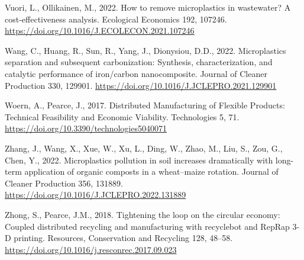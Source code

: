 \documentclass[]{elsarticle} %
\newlength{\cslhangindent}
\newlength{\cslentryspacingunit} %
\newenvironment{CSLReferences}[2] %
 {%
  \setlength{\parindent}{0pt}
  \ifodd #1
  \let\oldpar\par
  \def\par{\hangindent=\cslhangindent\oldpar}
  \fi
  \setlength{\parskip}{#2\cslentryspacingunit}
 }%
 {}
\begin{document}
\begin{CSLReferences}{1}{0}
\leavevmode{}%
Vuori, L., Ollikainen, M., 2022. How to remove microplastics in wastewater? {A} cost-effectiveness analysis. Ecological Economics 192, 107246. \url{https://doi.org/10.1016/J.ECOLECON.2021.107246}

\leavevmode{}%
Wang, C., Huang, R., Sun, R., Yang, J., Dionysiou, D.D., 2022. Microplastics separation and subsequent carbonization: {Synthesis}, characterization, and catalytic performance of iron/carbon nanocomposite. Journal of Cleaner Production 330, 129901. \url{https://doi.org/10.1016/J.JCLEPRO.2021.129901}

\leavevmode{}%
Woern, A., Pearce, J., 2017. Distributed {Manufacturing} of {Flexible Products}: {Technical Feasibility} and {Economic Viability}. Technologies 5, 71. \url{https://doi.org/10.3390/technologies5040071}

\leavevmode{}%
Zhang, J., Wang, X., Xue, W., Xu, L., Ding, W., Zhao, M., Liu, S., Zou, G., Chen, Y., 2022. Microplastics pollution in soil increases dramatically with long-term application of organic composts in a wheat--maize rotation. Journal of Cleaner Production 356, 131889. \url{https://doi.org/10.1016/J.JCLEPRO.2022.131889}

\leavevmode{}%
Zhong, S., Pearce, J.M., 2018. Tightening the loop on the circular economy: {Coupled} distributed recycling and manufacturing with recyclebot and {RepRap} 3-{D} printing. Resources, Conservation and Recycling 128, 48--58. \url{https://doi.org/10.1016/j.resconrec.2017.09.023}

\end{CSLReferences}
\end{document}
